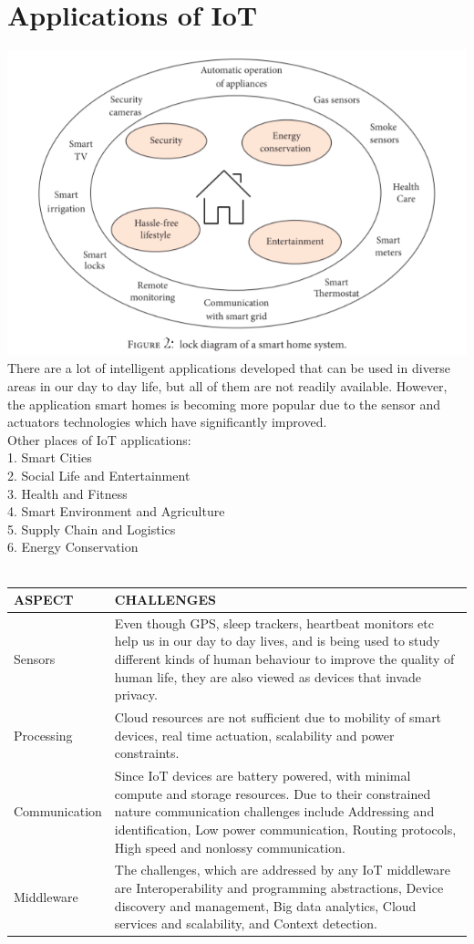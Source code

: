\documentclass{article}
\begin{document}
\section*{Applications of IoT}
\vspace{1em}
        \includegraphics[width=0.8\linewidth]{fig2.png}
\vspace{1em}\\
There are a lot of intelligent applications developed that can be used in diverse areas in our day to day life, but all of them are not readily available. However, the application smart homes is becoming more popular due to the sensor and actuators technologies which have significantly improved.\\
Other places of IoT applications:\\
1. Smart Cities\\
2. Social Life and Entertainment\\
3. Health and Fitness\\
4. Smart Environment and Agriculture\\
5. Supply Chain and Logistics\\
6. Energy Conservation\\
\\

\begin{tabular}{|p{3cm}|p{10cm}|}
\hline
ASPECT & CHALLENGES \\ \hline
Sensors & Even though GPS, sleep trackers, heartbeat monitors etc help us in our day to day lives, and is being used to study different kinds of human behaviour to improve the quality of human life, they are also viewed as devices that invade privacy. \\ \hline
Processing & Cloud resources are not sufficient due to mobility of smart devices, real time actuation, scalability and power constraints. \\ \hline
Communication & Since IoT devices are battery powered, with minimal compute and storage resources. Due to their constrained nature communication challenges include Addressing and identification, Low power communication, Routing protocols, High speed and nonlossy communication. \\ \hline
Middleware & The challenges, which are addressed by any IoT middleware are Interoperability and programming abstractions, Device discovery and management, Big data analytics, Cloud services and scalability, and Context detection. \\ \hline
\end{tabular}
\end{document}
